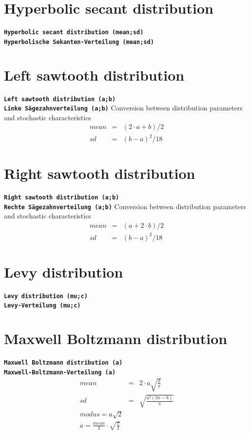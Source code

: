 \documentclass{svmono}
\def\cm#1{\textbf{\texttt{#1}}}
\begin{document}
\section*{Hyperbolic secant distribution}
\cm{Hyperbolic secant distribution (mean;sd)}~\\
\cm{Hyperbolische Sekanten-Verteilung (mean;sd)}





\section*{Left sawtooth distribution}
\cm{Left sawtooth distribution (a;b)}~\\
\cm{Linke Sägezahnverteilung (a;b)}
Conversion between distribution parameters and stochastic characteristics
\begin{eqnarray*}
mean&=&(2\cdot a+b)/2\\
sd&=&(b-a)^2/18
\end{eqnarray*}





\section*{Right sawtooth distribution}
\cm{Right sawtooth distribution (a;b)}~\\
\cm{Rechte Sägezahnverteilung (a;b)}
Conversion between distribution parameters and stochastic characteristics
\begin{eqnarray*}
mean&=&(a+2\cdot b)/2\\
sd&=&(b-a)^2/18
\end{eqnarray*}





\section*{Levy distribution}
\cm{Levy distribution (mu;c)}~\\
\cm{Levy-Verteilung (mu;c)}





\section*{Maxwell Boltzmann distribution}
\cm{Maxwell Boltzmann distribution (a)}~\\
\cm{Maxwell-Boltzmann-Verteilung (a)}
\begin{eqnarray*}
mean&=&2\cdot a\sqrt{\frac{2}{\pi}}\\
sd&=&\sqrt{\frac{a^2(3\pi-8)}{\pi}}\\
modus=a\sqrt{2}\\
a=\frac{mean}{2}\cdot\sqrt{\frac{\pi}{2}}
\end{eqnarray*}
\end{document}
